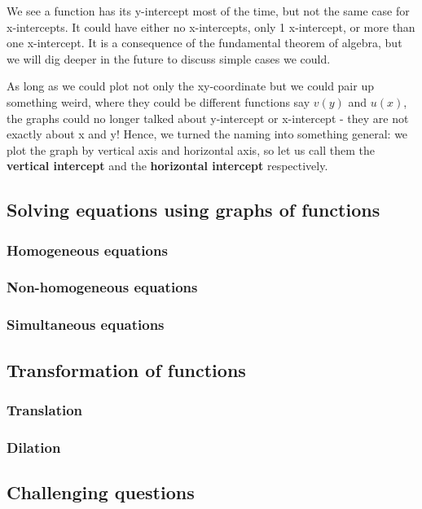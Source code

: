 \documentclass[12pt]{article}
\begin{document}
    We see a function has its y-intercept most of the time, but not the same case for x-intercepts. It could have either no x-intercepts, only 1 x-intercept, or more than one x-intercept. It is a consequence of the fundamental theorem of algebra, but we will dig deeper in the future to discuss simple cases we could.

    As long as we could plot not only the xy-coordinate but we could pair up something weird, where they could be different functions say $v(y)$ and $u(x)$, the graphs could no longer talked about y-intercept or x-intercept - they are not exactly about x and y! Hence, we turned the naming into something general: we plot the graph by vertical axis and horizontal axis, so let us call them the \textbf{vertical intercept} and the \textbf{horizontal intercept} respectively.

    \subsection{Solving equations using graphs of functions}

    \subsubsection*{Homogeneous equations}

    \subsubsection*{Non-homogeneous equations}

    \subsubsection*{Simultaneous equations}

    \subsection{Transformation of functions}

    \subsubsection*{Translation}

    \subsubsection*{Dilation}

    \subsection{Challenging questions}
\end{document}
